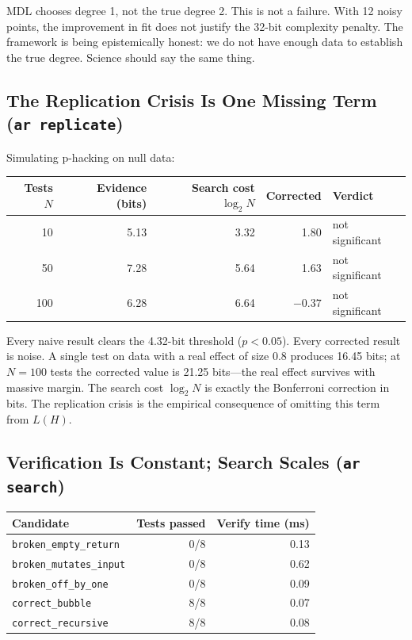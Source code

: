 MDL chooses degree 1, not the true degree 2. This is not a failure.
With 12 noisy points, the improvement in fit does not justify the
32-bit complexity penalty. The framework is being epistemically honest:
we do not have enough data to establish the true degree. Science should
say the same thing.

\subsection{The Replication Crisis Is One Missing Term
  (\texttt{ar replicate})}

Simulating p-hacking on null data:

\begin{center}
\begin{tabular}{rrrrl}
\toprule
Tests $N$ & Evidence (bits) & Search cost $\log_2 N$ & Corrected & Verdict \\
\midrule
10  & 5.13 & 3.32 & 1.80    & not significant \\
50  & 7.28 & 5.64 & 1.63    & not significant \\
100 & 6.28 & 6.64 & $-0.37$ & not significant \\
\bottomrule
\end{tabular}
\end{center}

Every naive result clears the 4.32-bit threshold ($p < 0.05$). Every
corrected result is noise. A single test on data with a real effect of
size 0.8 produces 16.45 bits; at $N = 100$ tests the corrected value
is 21.25 bits---the real effect survives with massive margin. The
search cost $\log_2 N$ is exactly the Bonferroni correction in bits.
The replication crisis is the empirical consequence of omitting this
term from $L(H)$.

\subsection{Verification Is Constant; Search Scales (\texttt{ar search})}

\begin{center}
\begin{tabular}{lrr}
\toprule
Candidate & Tests passed & Verify time (ms) \\
\midrule
\texttt{broken\_empty\_return}  & 0/8 & 0.13 \\
\texttt{broken\_mutates\_input} & 0/8 & 0.62 \\
\texttt{broken\_off\_by\_one}   & 0/8 & 0.09 \\
\texttt{correct\_bubble}        & 8/8 & 0.07 \\
\texttt{correct\_recursive}     & 8/8 & 0.08 \\
\bottomrule
\end{tabular}
\end{center}

